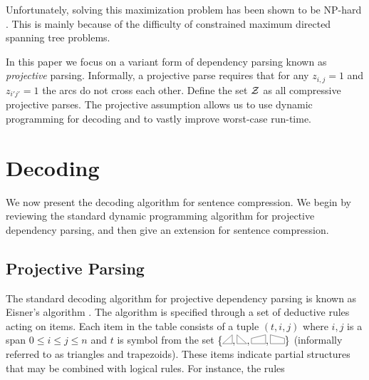 \documentclass[11pt]{article}
\newcommand{\rtrap}{\scalebox{0.2}{\tikz{
    \coordinate (A) at (0,0);
    \coordinate (B) at (90:1.5cm);
    \coordinate (C) at (2.5,0.9cm);
    \coordinate (D) at (0:2.5cm);
    \draw[line width = 0.05cm] (A)--(B)--(C)--(D)--cycle;
    }}}
\newcommand{\ltrap}{\scalebox{0.2}{\tikz{
    \coordinate (A) at (0,0);
    \coordinate (B) at (90:1.5cm);
    \coordinate (C) at (-2.5,0.9cm);
    \coordinate (D) at (180:2.5cm);
    \draw[line width = 0.05cm] (A)--(B)--(C)--(D)--cycle;
    }}}
\newcommand{\rtri}{\scalebox{0.2}{\tikz{
    \coordinate (A) at (0,0);
    \coordinate (B) at (90:1.5cm);
    \coordinate (C) at (180:-1.7cm);
    \draw[line width = 0.05cm] (A)--(B)--(C)--cycle;
    }}}
\newcommand{\ltri}{\scalebox{0.2}{\tikz{
    \coordinate (A) at (0,0);
    \coordinate (B) at (90:1.5cm);
    \coordinate (C) at (180:1.7cm);
    \draw[line width = 0.05cm] (A)--(B)--(C)--cycle;
    }}}
\begin{document}
Unfortunately, solving this maximization problem has been shown to be NP-hard \cite{}. This is mainly because of the difficulty of constrained maximum directed spanning tree problems.  

In this paper we focus on a variant form of dependency parsing known
as \textit{projective} parsing. Informally, a projective parse requires that for any $z_{i,j}=1$ and
$z_{i'j'}=1$ the arcs do not cross each other. Define the set ${\cal Z}$ as all compressive projective parses. 
The projective assumption allows us to use dynamic programming for decoding and to vastly improve worst-case
run-time.













\section{Decoding}


We now present the decoding algorithm for sentence compression. We begin by
reviewing the standard dynamic programming algorithm for projective
dependency parsing, and then give an extension for sentence 
compression.

\subsection{Projective Parsing}

The standard decoding algorithm for projective dependency parsing is
known as Eisner's algorithm \cite{eisner, mcdonald}.  The algorithm is
specified through a set of deductive rules acting on items.  Each item
in the table consists of a tuple $(t, i, j)$ where $i, j$ is a span
$0\leq i \leq j \leq n$ and $t$ is symbol from the set
$\{\ltri,\rtri, \ltrap, \rtrap\}$ (informally referred to as triangles
and trapezoids). These items indicate partial structures that may be 
combined with logical rules. For instance, the rules
\end{document}
